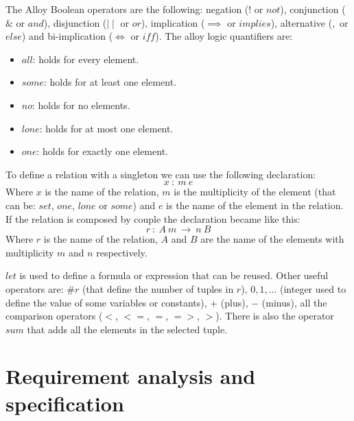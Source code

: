 \documentclass[12pt, a4paper]{report}
\newtheorem[style=M,bodystyle=\normalfont]{theorem}{Theorem}
\newtheorem[style=M,bodystyle=\normalfont]{corollary}{Corollary}
\newtheorem[style=M,bodystyle=\normalfont]{lemma}{Lemma}
\newtheorem[style=M,bodystyle=\normalfont]{definition}{Definition}
\begin{document}
    The Alloy Boolean operators are the following: negation ($!$ or $not$), conjunction ($\&$ or $and$), disjunction ($\mid \mid$ or $or$), implication ($\implies$ or $implies$), alternative ($,$ or $else$) and bi-implication ($\iff$ or $iff$). The alloy logic quantifiers are: 
    \begin{itemize}
        \item $all$: holds for every element.
        \item $some$: holds for at least one element.
        \item $no$: holds for no elements.
        \item $lone$: holds for at most one element.
        \item $one$: holds for exactly one element.
    \end{itemize}
    To define a relation with a singleton we can use the following declaration: 
    \[x \: : \: m \: e\]
    Where $x$ is the name of the relation, $m$ is the multiplicity of the element (that can be: $set$, $one$, $lone$ or $some$) and $e$ is the name of the element in the relation. If the relation is composed by couple the declaration became like this: 
    \[r \: : \: A \: m \: \rightarrow \: n \: B\]
    Where $r$ is the name of the relation, $A$ and $B$ are the name of the elements with multiplicity $m$ and $n$ respectively.
    \par
    $let$ is used to define a formula or expression that can be reused. Other useful operators are: $\# r$ (that define the number of tuples in $r$), $0,1,\dots$ (integer used to define the value of some variables or constants), $+$ (plus), $-$ (minus), all the comparison operators ($<$, $<=$, $=$, $=>$, $>$). There is also the operator $sum$ that adds all the elements in the selected tuple. 
    
\newpage

\chapter{Requirement analysis and specification}
\end{document}
